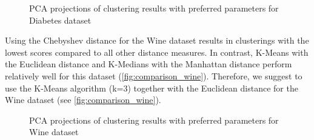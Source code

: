 \begin{figure}[H]
	\centering
	\caption{PCA projections of clustering results with preferred parameters for Diabetes dataset}
	\label{fig:iris_bestparams}
\end{figure}

Using the Chebyshev distance for the Wine dataset results in clusterings with the lowest scores compared to all other distance measures. In contrast, K-Means with the Euclidean distance and K-Medians with the Manhattan distance perform relatively well for this dataset (\autoref{fig:comparison_wine}). Therefore, we suggest to use the K-Means algorithm (k=3) together with the Euclidean distance for the Wine dataset (see \autoref{fig:comparison_wine}). 

\begin{figure}[H]
	\centering
	\caption{PCA projections of clustering results with preferred parameters for Wine dataset}
	\label{fig:wine_bestparams}
\end{figure}

